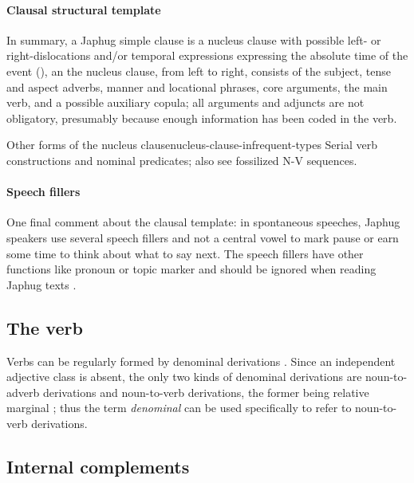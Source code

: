 \documentclass[a4paper, oneside, 12pt]{report}
\newcommand*{\citesec}[1]{\S~{#1}}
\newcommand*{\citechap}[1]{Ch~{#1}}
\newcommand*{\citepage}[1]{p.~{#1}}
\newcommand*{\term}[1]{\emph{#1}}
\begin{document}
\paragraph*{Clausal structural template}
In summary, a Japhug simple clause is a nucleus clause with possible left- or right-dislocations
and/or temporal expressions expressing the absolute time of the event
(),
an the nucleus clause, from left to right,
consists of the subject,
tense and aspect adverbs,
manner and locational phrases,
core arguments, the main verb, and a possible auxiliary copula;
all arguments and adjuncts are not obligatory,
presumably because enough information has been coded in the verb.

\begin{todobox}{Other forms of the nucleus clause}{nucleus-clause-infrequent-types}
    Serial verb constructions and nominal predicates;
    also see fossilized N-V sequences. 
\end{todobox}

\paragraph*{Speech fillers}
One final comment about the clausal template:
in spontaneous speeches, Japhug speakers use several speech fillers and not a central vowel 
to mark pause or earn some time to think about what to say next.
The speech fillers have other functions like pronoun or topic marker
and should be ignored when reading Japhug texts
\citep[\citesec{10.3}]{jacques2021grammar}.

\subsection{The verb}


Verbs can be regularly formed by denominal derivations
\citep[\citechap{20}]{jacques2021grammar}.
Since an independent adjective class is absent, 
the only two kinds of denominal derivations 
are noun-to-adverb derivations and noun-to-verb derivations,
the former being relative marginal \citep[\citepage{1011}]{jacques2021grammar};
thus the term \term{denominal} can be used specifically 
to refer to noun-to-verb derivations.

\subsection{Internal complements}\label{sec:grammatical.clause.internal}
\end{document}
